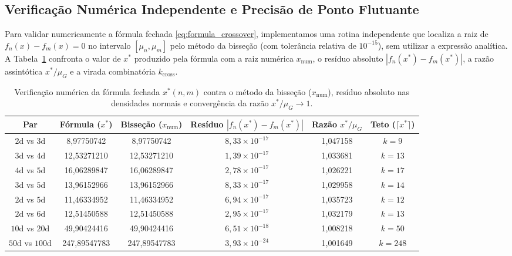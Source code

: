 \documentclass[11pt,a4paper]{article}
\theoremstyle{definition}
\theoremstyle{remark}
\begin{document}
\subsection{Verificação Numérica Independente e Precisão de Ponto Flutuante}

Para validar numericamente a fórmula fechada \eqref{eq:formula_crossover}, implementamos uma rotina independente que localiza a raiz de $f_n(x) - f_m(x) = 0$ no intervalo $[\mu_n, \mu_m]$ pelo método da bisseção (com tolerância relativa de $10^{-15}$), sem utilizar a expressão analítica. A Tabela~\ref{tab:verificacao_numerica} confronta o valor de $x^*$ produzido pela fórmula com a raiz numérica $x_{\text{num}}$, o resíduo absoluto $|f_n(x^*) - f_m(x^*)|$, a razão assintótica $x^* / \mu_G$ e a virada combinatória $k_{\text{cross}}$.

\begin{table}[H]
\centering
\caption{Verificação numérica da fórmula fechada $x^*(n,m)$ contra o método da bisseção ($x_{\text{num}}$), resíduo absoluto nas densidades normais e convergência da razão $x^*/\mu_G \to 1$.}
\label{tab:verificacao_numerica}
\vspace{0.3em}
\footnotesize
\setlength{\tabcolsep}{3.5pt}
\begin{tabular}{@{}cccccc@{}}
\toprule
\textbf{Par} & \textbf{Fórmula ($x^*$)} & \textbf{Bisseção ($x_{\text{num}}$)} & \textbf{Resíduo $|f_n(x^*) - f_m(x^*)|$} & \textbf{Razão $x^*/\mu_G$} & \textbf{Teto ($\lceil x^* \rceil$)} \\
\midrule
$2\text{d}$ vs $3\text{d}$    &  8,97750742  &  8,97750742  & $8{,}33 \times 10^{-17}$ & 1,047158 & $k = 9$   \\
$3\text{d}$ vs $4\text{d}$    & 12,53271210  & 12,53271210  & $1{,}39 \times 10^{-17}$ & 1,033681 & $k = 13$  \\
$4\text{d}$ vs $5\text{d}$    & 16,06289847  & 16,06289847  & $2{,}78 \times 10^{-17}$ & 1,026221 & $k = 17$  \\
$3\text{d}$ vs $5\text{d}$    & 13,96152966  & 13,96152966  & $8{,}33 \times 10^{-17}$ & 1,029958 & $k = 14$  \\
$2\text{d}$ vs $5\text{d}$    & 11,46334952  & 11,46334952  & $6{,}94 \times 10^{-17}$ & 1,035723 & $k = 12$  \\
$2\text{d}$ vs $6\text{d}$    & 12,51450588  & 12,51450588  & $2{,}95 \times 10^{-17}$ & 1,032179 & $k = 13$  \\
$10\text{d}$ vs $20\text{d}$  & 49,90424416  & 49,90424416  & $6{,}51 \times 10^{-18}$ & 1,008218 & $k = 50$  \\
$50\text{d}$ vs $100\text{d}$ & 247,89547783 & 247,89547783 & $3{,}93 \times 10^{-24}$ & 1,001649 & $k = 248$ \\
\bottomrule
\end{tabular}
\end{table}
\end{document}
